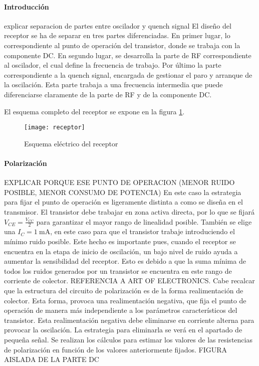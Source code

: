 \paragraph{Introducci\'on}
explicar separacion de partes entre oscilador y quench signal
El diseño del receptor se ha de separar en tres partes diferenciadas. En primer lugar, lo correspondiente al punto de operación del transistor, donde se trabaja con la componente DC. En segundo lugar, se desarrolla la parte de RF correspondiente al oscilador, el cual define la frecuencia de trabajo. Por último la parte correspondiente a la quench signal, encargada de gestionar el paro y arranque de la oscilación. Esta parte trabaja a una frecuencia intermedia que puede diferenciarse claramente de la parte de RF y de la componente DC.

El esquema completo del receptor se expone en la figura \ref{fig:rx}.
\begin{figure}[h]
    \centering
    \texttt{[image: receptor]}
    \caption{Esquema el\'ectrico del receptor}
    \label{fig:rx}
\end{figure}

\paragraph{Polarización} EXPLICAR PORQUE ESE PUNTO DE OPERACION (MENOR RUIDO POSIBLE, MENOR CONSUMO DE POTENCIA)
En este caso la estrategia para fijar el punto de operación es ligeramente distinta a como se diseña en el transmisor. El transistor debe trabajar en zona activa directa, por lo que se fijará $V_{CE} = \frac{V_{CC}}{2}$ para garantizar el mayor rango de linealidad posible. También se elige una $I_C = \SI{1}{\milli\ampere}$, en este caso para que el transistor trabaje introduciendo el mínimo ruido posible. Este hecho es importante pues, cuando el receptor se encuentra en la etapa de inicio de oscilación, un bajo nivel de ruido ayuda a aumentar la sensibilidad del receptor. Esto es debido a que la suma mínima de todos los ruidos generados por un transistor se encuentra en este rango de corriente de colector. REFERENCIA A ART OF ELECTRONICS.
Cabe recalcar que la estructura del circuito de polarización es de la forma realimentación de colector. Esta forma, provoca una realimentación negativa, que fija el punto de operación de manera más independiente a los parámetros característicos del transistor. Esta realimentación negativa debe eliminarse en corriente alterna para provocar la oscilación. La estrategia para eliminarla se verá en el apartado de pequeña señal.
Se realizan los cálculos para estimar los valores de las resistencias de polarización en función de los valores anteriormente fijados.
FIGURA AISLADA DE LA PARTE DC

